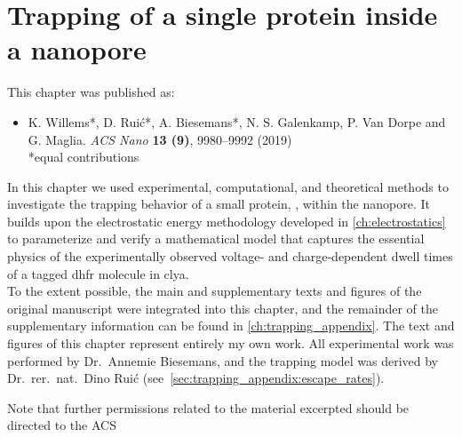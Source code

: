\chapter{Trapping of a single protein inside a nanopore}
%
\label{ch:trapping}
%
%
%
%

%
%
\begin{shaded}
This chapter was published as:
%
\begin{itemize}
  \item K. Willems*, D. Rui\'{c}*, A. Biesemans*, N. S. Galenkamp, P. Van Dorpe and G. Maglia.
        \textit{ACS Nano} \textbf{13 (9)}, 9980--9992 (2019) %
        \\
        *equal contributions
\end{itemize}
% 
\newpage
\end{shaded}
%
%

%

In this chapter we used experimental, computational, and theoretical methods to investigate the trapping
behavior of a small protein, , within the  nanopore. It builds upon the
electrostatic energy methodology developed in \cref{ch:electrostatics} to parameterize and verify a
mathematical model that captures the essential physics of the experimentally observed voltage- and
charge-dependent dwell times of a tagged \gls{dhfr} molecule in \gls{clya}. \\
%

%
To the extent possible, the main and supplementary texts and figures of the original manuscript were
integrated into this chapter, and the remainder of the supplementary information can be found in
\cref{ch:trapping_appendix}. The text and figures of this chapter represent entirely my own work. All
experimental work was performed by Dr.~Annemie Biesemans, and the trapping model was derived by
Dr.~rer.~nat.~Dino Rui\'{c} (see~\cref{sec:trapping_appendix:escape_rates}).
%

%
%

%
Note that further permissions related to the material excerpted should be directed to the ACS
%
%
%



